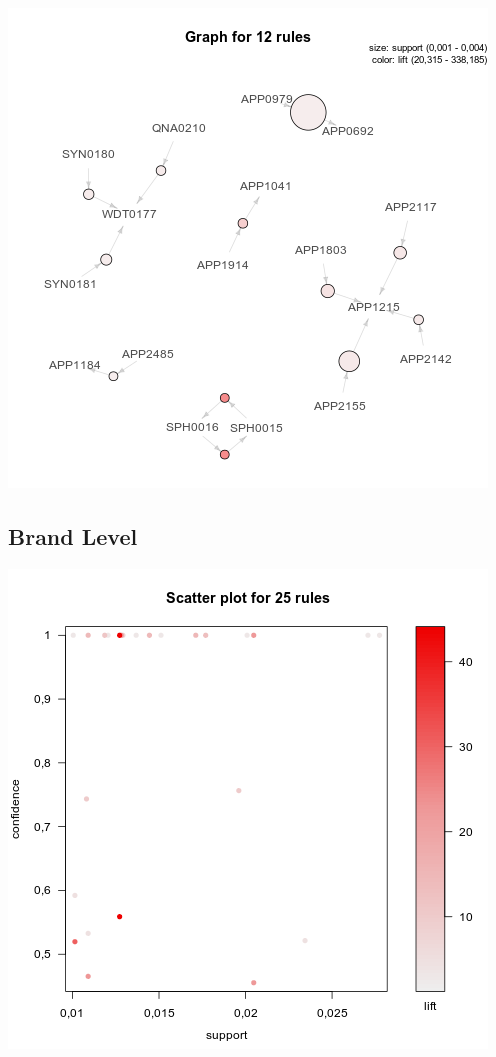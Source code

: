 \documentclass[12pt,a4paper,leqno]{report}
\theoremstyle{plain}
\theoremstyle{definition}
\theoremstyle{remark}
\begin{document}
\bigskip
{
    \centering
    \includegraphics[width=\textwidth,height=\textheight,keepaspectratio]{apriori_product_level_graph.png}
    \par
}
\bigskip


\subsection{Brand Level}

\bigskip
{
    \centering
    \includegraphics[width=\textwidth,height=\textheight,keepaspectratio]{apriori_brand_level_plot.png}
    \par
}
\bigskip
\end{document}

